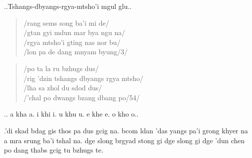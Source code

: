 \documentclass[a4paper,parskip,12pt]{scrarticle}
\begin{document}
\begin{otherlanguage}{wylie}
  ..Tshangs-dbyangs-rgya-mtsho'i mgul glu..

  \begin{verse}
    /rang sems song ba'i mi de/\\
    /gtan gyi mdun mar bya ngu na/\\
    /rgya mtsho'i gting nas nor bu/\\
    /lon pa de dang mnyam byung/3/
  \end{verse}

  \begin{verse}
    /po ta la ru bzhugs dus/\\
    /rig 'dzin tshangs dbyangs rgya mtsho/\\
    /lha sa zhol du sdod dus/\\
    /'chal po dwangs bzang dbang po/54/
  \end{verse}

  \bigskip

  .. a kha a. i khi i. u khu u. e khe e. o kho o..%
  
  .’di skad bdag gis thos pa dus gcig na.
  bcom ldan ’das yangs pa’i grong khyer na a mra srung ba’i tshal na.
  dge slong brgyad stong gi dge slong gi dge ’dun chen po dang thabs gcig tu bzhugs te.

  
\end{otherlanguage}
\end{document}
